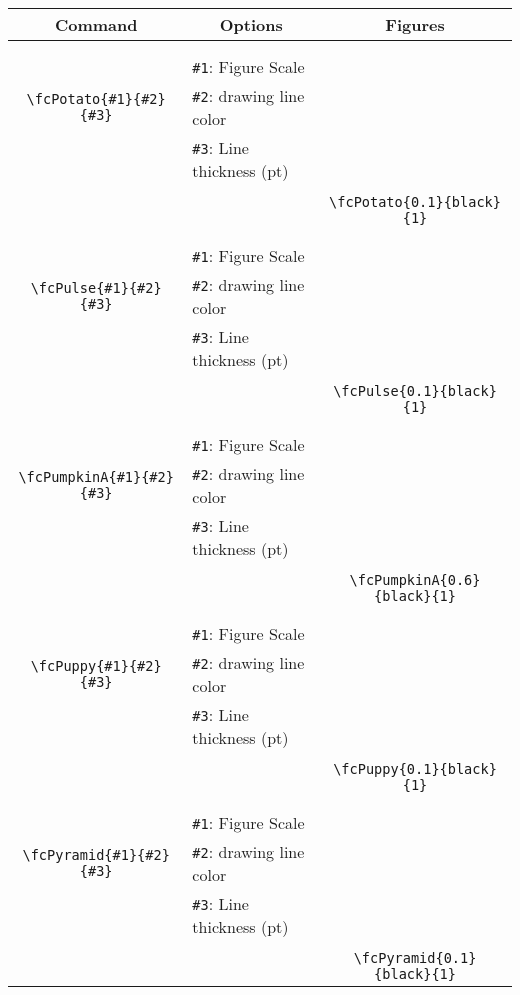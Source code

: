 \documentclass[x11names]{article}
\begin{document}
\begin{table}[H]\centering\begin{tabular}{|c|l|c|}\hline {\bf Command}& \multicolumn{1}{c|}{{\bf Options}} & {\bf Figures}\\  \hline	&&\multirow{5}{*}{\fcPotato{0.1}{black}{1}}\\	&&\\	&\verb|#1|: Figure Scale &\\	\verb|\fcPotato{#1}{#2}{#3}|&	\verb|#2|: drawing line color &\\	&\verb|#3|: Line thickness (pt) &\\ &&\\&&	\verb|\fcPotato{0.1}{black}{1}|\\\hline 	
	&&\multirow{5}{*}{\fcPulse{0.1}{black}{1}}\\	&&\\	&\verb|#1|: Figure Scale &\\	\verb|\fcPulse{#1}{#2}{#3}|&	\verb|#2|: drawing line color &\\	&\verb|#3|: Line thickness (pt) &\\ &&\\&&	\verb|\fcPulse{0.1}{black}{1}|\\\hline 	
	&&\multirow{5}{*}{\fcPumpkinA{0.6}{black}{1}}\\	&&\\	&\verb|#1|: Figure Scale &\\	\verb|\fcPumpkinA{#1}{#2}{#3}|&	\verb|#2|: drawing line color &\\	&\verb|#3|: Line thickness (pt) &\\ &&\\&&	\verb|\fcPumpkinA{0.6}{black}{1}|\\\hline 	
	&&\multirow{5}{*}{\fcPuppy{0.1}{black}{1}}\\	&&\\	&\verb|#1|: Figure Scale &\\	\verb|\fcPuppy{#1}{#2}{#3}|&	\verb|#2|: drawing line color &\\	&\verb|#3|: Line thickness (pt) &\\ &&\\&&	\verb|\fcPuppy{0.1}{black}{1}|\\\hline 	
	&&\multirow{5}{*}{\fcPyramid{0.1}{black}{1}}\\	&&\\	&\verb|#1|: Figure Scale &\\	\verb|\fcPyramid{#1}{#2}{#3}|&	\verb|#2|: drawing line color &\\	&\verb|#3|: Line thickness (pt) &\\ &&\\&&	\verb|\fcPyramid{0.1}{black}{1}|\\\hline 	

\end{tabular}
\end{table}
\end{document}
